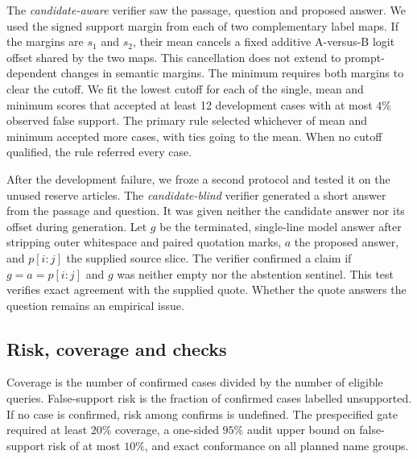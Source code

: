 \documentclass[11pt,a4paper]{article}
\begin{document}
The \emph{candidate-aware} verifier saw the passage, question and proposed answer. We used the signed support margin from each of two complementary label maps. If the margins are \(s_1\) and \(s_2\), their mean cancels a fixed additive A-versus-B logit offset shared by the two maps. This cancellation does not extend to prompt-dependent changes in semantic margins. The minimum requires both margins to clear the cutoff. We fit the lowest cutoff for each of the single, mean and minimum scores that accepted at least 12 development cases with at most \(4\%\) observed false support. The primary rule selected whichever of mean and minimum accepted more cases, with ties going to the mean. When no cutoff qualified, the rule referred every case.

After the development failure, we froze a second protocol and tested it on the unused reserve articles. The \emph{candidate-blind} verifier generated a short answer from the passage and question. It was given neither the candidate answer nor its offset during generation. Let \(g\) be the terminated, single-line model answer after stripping outer whitespace and paired quotation marks, \(a\) the proposed answer, and \(p[i:j]\) the supplied source slice. The verifier confirmed a claim if \(g=a=p[i:j]\) and \(g\) was neither empty nor the abstention sentinel. This test verifies exact agreement with the supplied quote. Whether the quote answers the question remains an empirical issue.



\subsection{Risk, coverage and checks}

Coverage is the number of confirmed cases divided by the number of eligible queries. False-support risk is the fraction of confirmed cases labelled unsupported. If no case is confirmed, risk among confirms is undefined. The prespecified gate required at least \(20\%\) coverage, a one-sided \(95\%\) audit upper bound on false-support risk of at most \(10\%\), and exact conformance on all planned name groups.
\end{document}
